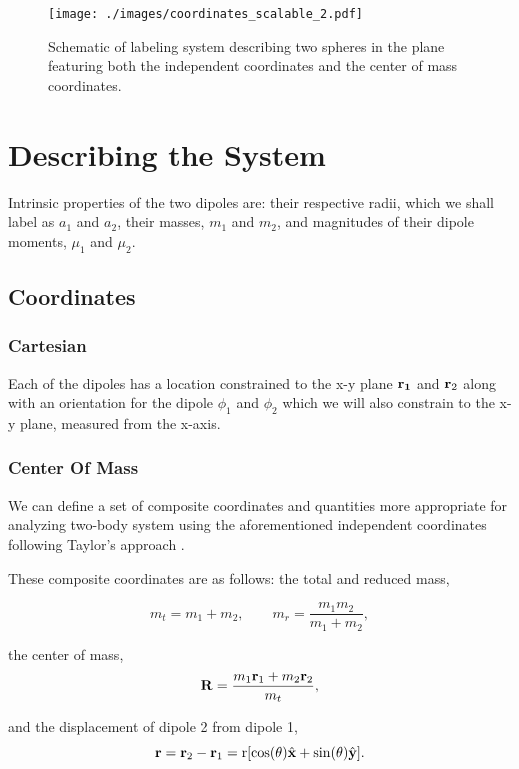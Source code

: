 \documentclass[prbg,preprint]{revtex4-1}
\newcommand{\cvec}[1]{{\rm{\bf{#1}}}}
\begin{document}
\begin{figure}[h]
  \centering
  \texttt{[image: ./images/coordinates\_scalable\_2.pdf]}
  \caption{Schematic of labeling system describing two spheres in the plane featuring both the independent coordinates and the center of mass coordinates.}
\end{figure}


\section{Describing the System}
Intrinsic properties of the two dipoles are: their respective radii, which we shall label as $a_1$ and $a_2$, their masses, $m_1$ and $m_2$, and magnitudes of their dipole moments, $\mu_1$ and $\mu_2$.
\subsection{Coordinates}
\subsubsection{Cartesian}

Each of the dipoles has a location constrained to the x-y plane $\cvec{r_1}$ and $\cvec r_2$ along with an orientation for the dipole $\phi_1$ and $\phi_2$ which we will also constrain to the x-y plane, measured from the x-axis.
\subsubsection{Center Of Mass}
We can define a set of composite coordinates and quantities more appropriate for analyzing two-body system using the aforementioned independent coordinates following Taylor's approach \cite{taylor2005classical}. 

These composite coordinates are as follows: the total and reduced mass,

\begin{equation}
m_t = m_1+m_2,
\qquad
m_r = \frac{m_1m_2}{m_1+m_2},
\end{equation}

the center of mass,
\begin{equation}
\cvec{R} = \frac{m_1 \cvec{r}_1+m_2 \cvec{r}_2}{m_t},
\end{equation}

and the displacement of dipole 2 from dipole 1,
\begin{equation}
\cvec{r}
=  \cvec r_2-\cvec r_1 
= \textrm{r} [\cos(\theta) \hat {\cvec x}+\sin(\theta) \hat {\cvec y}].
\end{equation}
\end{document}
